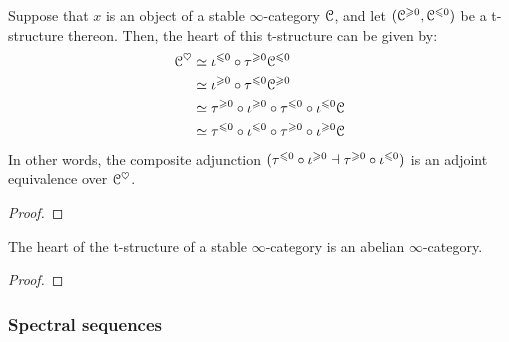                 \begin{corollary} \label{coro: short_exact_sequences_and_truncations}
                    Suppose that $x$ is an object of a stable $\infty$-category $\mathcal{C}$, and let $(\mathcal{C}^{\geqslant 0}, \mathcal{C}^{\leqslant 0})$ be a t-structure thereon. Then, the heart of this t-structure can be given by:
                        $$
                            \begin{aligned}
                                \mathcal{C}^{\heartsuit} & \simeq \iota^{\leqslant 0} \circ \tau^{\geqslant 0} \mathcal{C}^{\leqslant 0}
                                \\
                                & \simeq \iota^{\geqslant 0} \circ \tau^{\leqslant 0} \mathcal{C}^{\geqslant 0} 
                                \\
                                & \simeq \tau^{\geqslant 0} \circ \iota^{\geqslant 0} \circ \tau^{\leqslant 0} \circ \iota^{\leqslant 0} \mathcal{C} 
                                \\
                                & \simeq \tau^{\leqslant 0} \circ \iota^{\leqslant 0} \circ \tau^{\geqslant 0} \circ \iota^{\geqslant 0} \mathcal{C}
                            \end{aligned}
                        $$
                    In other words, the composite adjunction $(\tau^{\leqslant 0} \circ \iota^{\geqslant 0} \dashv \tau^{\geqslant 0} \circ \iota^{\leqslant 0})$ is an adjoint equivalence over $\mathcal{C}^{\heartsuit}$. 
                \end{corollary}
                    \begin{proof}
                        
                    \end{proof}
                
                \begin{theorem} \label{theorem: hearts_are_abelian} 
                    The heart of the t-structure of a stable $\infty$-category is an abelian $\infty$-category.
                \end{theorem}
                    \begin{proof}
                        
                    \end{proof}
                    
            \subsubsection{Spectral sequences}
            
